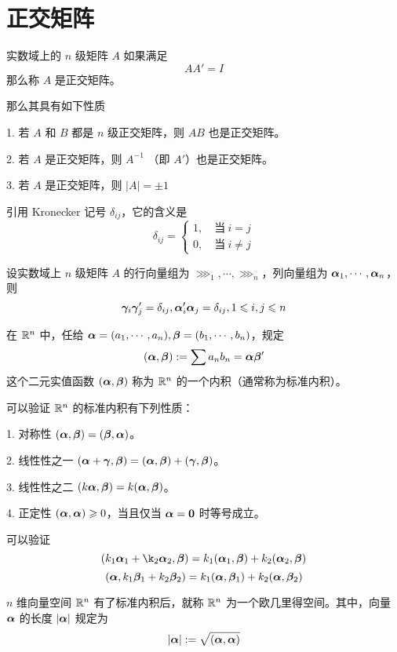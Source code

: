 \section{正交矩阵}

\begin{definition}
    实数域上的 $n$ 级矩阵 $A$ 如果满足
    $$AA'=I$$
    那么称 $A$ 是正交矩阵。
\end{definition}

那么其具有如下性质

1. 若 $A$ 和  $B$ 都是 $n$ 级正交矩阵，则 $AB$ 也是正交矩阵。

2. 若 $A$ 是正交矩阵，则 $A^{-1}$ （即 $A'$）也是正交矩阵。

3. 若 $A$ 是正交矩阵，则 $|A|=\pm 1$


引用 Kronecker 记号 $\delta_{ij}$，它的含义是
$$\delta_{ij}=\begin{cases}
    1,\quad \text{当}\ i=j\\
    0,\quad \text{当}\ i\ne j
\end{cases}$$

\begin{theorem}
    设实数域上 $n$ 级矩阵 $A$ 的行向量组为 $\ggg_1,\cdots,\ggg_n$，列向量组为 $\aaa_1,\cdots,\aaa_n$，则
    $$\ggg_i\ggg_j'=\delta_{ij},\aaa_i'\aaa_j=\delta_{ij},1 \leqslant i,j \leqslant n$$
\end{theorem}

\begin{definition}
    在 $\RR^n$ 中，任给 $\aaa = (a_1,\cdots,a_n),\bbb=(b_1,\cdots,b_n)$，规定
    $$(\aaa,\bbb) := \sum a_nb_n = \aaa\bbb'$$
    这个二元实值函数 $(\aaa,\bbb)$ 称为 $\RR^n$ 的一个内积（通常称为标准内积）。
\end{definition}

可以验证 $\RR^n$ 的标准内积有下列性质：

1. 对称性 $(\aaa,\bbb) = (\bbb,\aaa)$。

2. 线性性之一 $(\aaa+\ggg,\bbb) = (\aaa,\bbb) + (\ggg,\bbb)$。

3. 线性性之二 $(k\aaa,\bbb) = k(\aaa,\bbb)$。

4. 正定性 $(\aaa,\aaa)\geqslant 0$，当且仅当 $\aaa=\ling$ 时等号成立。

可以验证
$$(k_1\aaa_1+\k_2\aaa_2,\bbb) = k_1(\aaa_1,\bbb) + k_2(\aaa_2,\bbb)$$
$$(\aaa,k_1\bbb_1+k_2\bbb_2) = k_1(\aaa,\bbb_1) + k_2(\aaa,\bbb_2)$$

$n$ 维向量空间 $\RR^n$ 有了标准内积后，就称 $\RR^n$ 为一个欧几里得空间。其中，向量 $\aaa$ 的长度 $|\aaa|$ 规定为
$$|\aaa| := \sqrt{(\aaa,\aaa)}$$

